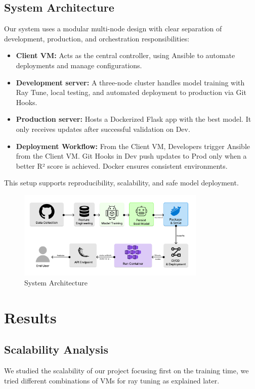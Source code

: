 \documentclass[12pt,a4paper]{article}
\begin{document}
\subsection{System Architecture}
Our system uses a modular multi-node design with clear separation of development, production, and orchestration responsibilities:
\begin{itemize}
    \item \textbf{Client VM:} Acts as the central controller, using Ansible to automate deployments and manage configurations.
    \item \textbf{Development server:} A three-node cluster handles model training with Ray Tune, local testing, and automated deployment to production via Git Hooks.
    \item \textbf{Production server:} Hosts a Dockerized Flask app with the best model. It only receives updates after successful validation on Dev.
    \item \textbf{Deployment Workflow:} From the Client VM,  Developers trigger Ansible from the Client VM. Git Hooks in Dev push updates to Prod only when a better R² score is achieved. Docker ensures consistent environments.
\end{itemize}
This setup supports reproducibility, scalability, and safe model deployment.
\begin{figure}[H]
  \centering
  \includegraphics[width=0.8\textwidth]{Architecture.png}
  \caption{System Architecture}
  \label{fig:my-image}
\end{figure}

\section{Results}
\subsection{Scalability Analysis}
We studied the scalability of our project focusing first on the training time, we tried different combinations of VMs for ray tuning as explained later.
\end{document}
